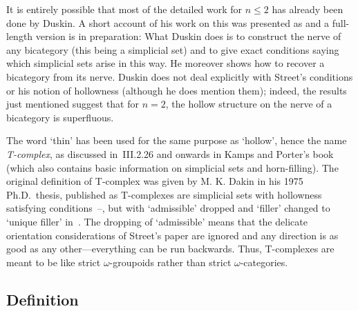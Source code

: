 It is entirely possible that most of the detailed work for $n\leq 2$ has
already been done by Duskin.  A short account of his work on this was
presented as
% 
%
% 
and a full-length version is in preparation:
% 
%
% 
What Duskin does is to construct the nerve of any bicategory (this being a
simplicial set) and to give exact conditions saying which simplicial sets
arise in this way.  He moreover shows how to recover a bicategory from its
nerve.  Duskin does not deal explicitly with Street's conditions or his
notion of hollowness (although he does mention them); indeed, the results
just mentioned suggest that for $n=2$, the hollow structure on the nerve of a
bicategory is superfluous.  

The word `thin' has been used for the same purpose as `hollow', hence the
name \emph{T-complex}, as discussed in~III.2.26 and onwards in Kamps and
Porter's book  (which also contains basic information on simplicial
sets and horn-filling). The original definition of T-complex was given by
M. K. Dakin in his 1975 Ph.D.\ thesis, published as
% 
%
% 
T-complexes are simplicial sets with hollowness satisfying
conditions~--, but with `admissible' dropped
and `filler' changed to `unique filler' in~.  The dropping
of `admissible' means that the delicate orientation considerations of
Street's paper are ignored and any direction is as good as any
other---everything can be run backwards.  Thus, T-complexes are meant to be
like strict $\omega$-groupoids rather than strict $\omega$-categories.




\subsection*{Definition }

